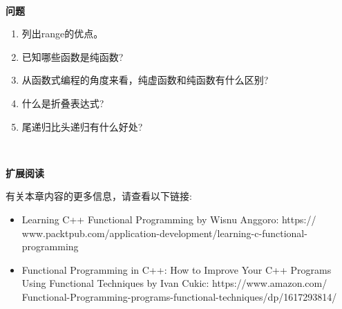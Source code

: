 \noindent\textbf{}\ \par
\textbf{问题} \ \par
\begin{enumerate}
	\item 列出range的优点。
	\item 已知哪些函数是纯函数?
	\item 从函数式编程的角度来看，纯虚函数和纯函数有什么区别?
	\item 什么是折叠表达式?
	\item 尾递归比头递归有什么好处?
\end{enumerate}

\noindent\textbf{}\ \par
\textbf{扩展阅读} \ \par
有关本章内容的更多信息，请查看以下链接: \par

\begin{itemize}
	\item Learning C++ Functional Programming by Wisnu Anggoro:  https:/​/​www.packtpub.​com/​application-​development/​learning-​c-​functional-​programming
	\item Functional Programming in C++: How to Improve Your C++ Programs Using Functional Techniques by Ivan Cukic:  https:/​/​www.​amazon.​com/​Functional-Programming-​programs-​functional-​techniques/​dp/​1617293814/​
\end{itemize}

\newpage







